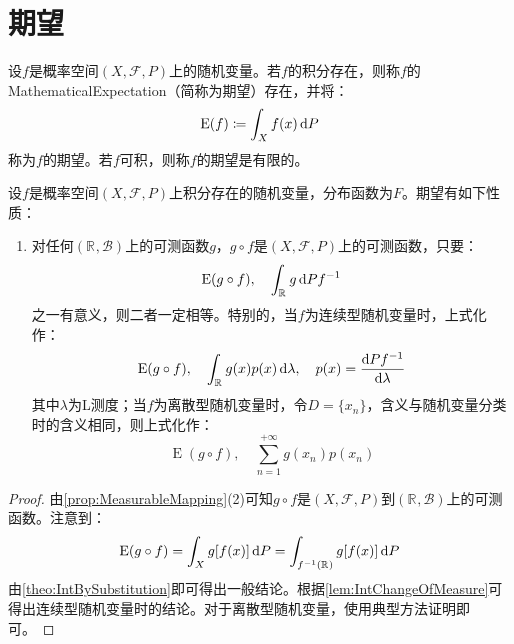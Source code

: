 \section{期望}

\begin{definition}
	设$f$是概率空间$(X,\mathscr{F},P)$上的随机变量。若$f$的积分存在，则称$f$的\gls{MathematicalExpectation}（简称为期望）存在，并将：
	\begin{equation*}
		\operatorname{E}(f)\coloneq\int_{X}f(x)\mathop{}\!\mathrm{d} P
	\end{equation*}
	称为$f$的期望。若$f$可积，则称$f$的期望是有限的。
\end{definition}
\begin{property}
	设$f$是概率空间$(X,\mathscr{F},P)$上积分存在的随机变量，分布函数为$F$。期望有如下性质：
	\begin{enumerate}
		\item 对任何$(\mathbb{R}^{},\mathcal{B})$上的可测函数$g$，$g\circ f$是$(X,\mathscr{F},P)$上的可测函数，只要：
		\begin{equation*}
			\operatorname{E}(g\circ f),\quad\int_{\mathbb{R}^{}}g\mathop{}\!\mathrm{d} Pf^{-1}
		\end{equation*}
		之一有意义，则二者一定相等。特别的，当$f$为连续型随机变量时，上式化作：
		\begin{equation*}
			\operatorname{E}(g\circ f),\quad\int_{\mathbb{R}^{}}g(x)p(x)\mathop{}\!\mathrm{d}\lambda,\quad p(x)=\frac{\mathop{}\!\mathrm{d} Pf^{-1}}{\mathop{}\!\mathrm{d}\lambda}
		\end{equation*}
		其中$\lambda$为L测度；当$f$为离散型随机变量时，令$D=\{x_n\}$，含义与随机变量分类时的含义相同，则上式化作：
		\begin{equation*}
				\operatorname{E}(g\circ f),\quad\sum_{n=1}^{+\infty}g(x_n)p(x_n)
		\end{equation*}
	\end{enumerate}
\end{property}
\begin{proof}
	由\cref{prop:MeasurableMapping}(2)可知$g\circ f$是$(X,\mathscr{F},P)$到$(\mathbb{R}^{},\mathcal{B})$上的可测函数。注意到：
	\begin{equation*}
		\operatorname{E}(g\circ f)=\int_{X}g[f(x)]\mathop{}\!\mathrm{d} P=\int_{f^{-1}(\mathbb{R}^{})}g[f(x)]\mathop{}\!\mathrm{d} P
	\end{equation*}
	由\cref{theo:IntBySubstitution}即可得出一般结论。根据\cref{lem:IntChangeOfMeasure}可得出连续型随机变量时的结论。对于离散型随机变量，使用典型方法证明即可。
\end{proof}

